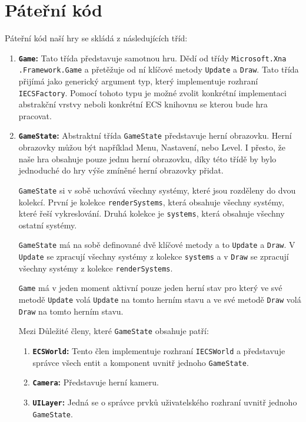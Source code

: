 \section{Páteřní kód}
Páteřní kód naší hry se skládá z následujících tříd:

\begin{enumerate}
    \item \textbf{\texttt{Game}:} Tato třída představuje samotnou hru. Dědí od třídy \texttt{Microsoft.Xna} \texttt{.Framework.Game} a přetěžuje od ní klíčové metody \verb|Update| a \verb|Draw|. Tato třída přijímá jako generický argument typ, který implementuje rozhraní \texttt{IECSFactory}. Pomocí tohoto typu je možné zvolit konkrétní implementaci abstrakční vrstvy neboli konkrétní ECS knihovnu se kterou bude hra pracovat.

    \item \textbf{\texttt{GameState}:} Abstraktní třída \verb|GameState| představuje herní obrazovku. Herní obrazovky můžou být například Menu, Nastavení, nebo Level. I přesto, že naše hra obsahuje pouze jednu herní obrazovku, díky této třídě by bylo jednoduché do hry výše zmíněné herní obrazovky přidat.

    \verb|GameState| si v sobě uchovává všechny systémy, které jsou rozděleny do dvou kolekcí. První je kolekce \verb|renderSystems|, která obsahuje všechny systémy, které řeší vykreslování. Druhá kolekce je \verb|systems|, která obsahuje všechny ostatní systémy.

    \verb|GameState| má na sobě definované dvě klíčové metody a to \verb|Update| a \verb|Draw|. V \verb|Update| se zpracují všechny systémy z kolekce \verb|systems| a v \verb|Draw| se zpracují všechny systémy z kolekce \verb|renderSystems|.

    \texttt{Game} má v jeden moment aktivní pouze jeden herní stav pro který ve své metodě \texttt{Update} volá \texttt{Update} na tomto herním stavu a ve své metodě \texttt{Draw} volá \texttt{Draw} na tomto herním stavu.

    Mezi Důležité členy, které \verb|GameState| obsahuje patří:

    \begin{enumerate}
        \item \textbf{\texttt{ECSWorld}:} Tento člen implementuje rozhraní \verb|IECSWorld| a představuje správce všech entit a komponent uvnitř jednoho \verb|GameState|.
        \item \textbf{\texttt{Camera}:} Představuje herní kameru.
        \item \textbf{\texttt{UILayer}:} Jedná se o správce prvků uživatelského rozhraní uvnitř jednoho \verb|GameState|.
    \end{enumerate}


\end{enumerate}
